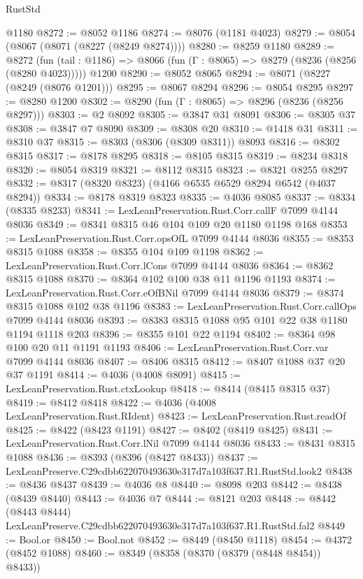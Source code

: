 \begin{lexlean}{RustStd}
\begin{coremodule}
    @1180
@8272 := @8052 @1186
@8274 := @8076 (@1181 @4023)
@8279 := @8054 (@8067 (@8071 (@8227 (@8249 @8274))))
@8280 := @8259 @1180
@8289 := @8272
    (fun (tail : @1186) => @8066 (fun (Γ : @8065) => @8279 (@8236 (@8256 (@8280 @4023)))))
    @1200
@8290 := @8052 @8065
@8294 := @8071 (@8227 (@8249 (@8076 @1201)))
@8295 := @8067 @8294
@8296 := @8054 @8295
@8297 := @8280 @1200
@8302 := @8290 (fun (Γ : @8065) => @8296 (@8236 (@8256 @8297)))
@8303 := @2 @8092
@8305 := @3847 @31 @8091
@8306 := @8305 @37
@8308 := @3847 @7 @8090
@8309 := @8308 @20
@8310 := @1418 @31
@8311 := @8310 @37
@8315 := @8303 (@8306 (@8309 @8311)) @8093
@8316 := @8302 @8315
@8317 := @8178 @8295
@8318 := @8105 @8315
@8319 := @8234 @8318
@8320 := @8054 @8319
@8321 := @8112 @8315
@8323 := @8321 @8255 @8297
@8332 := @8317 (@8320 @8323) (@4166 @6535 @6529 @8294 @6542 (@4037 @8294))
@8334 := @8178 @8319 @8323
@8335 := @4036 @8085
@8337 := @8334 (@8335 @8233)
@8341 := LexLeanPreservation.Rust.Corr.callF @7099 @4144 @8036
@8349 := @8341 @8315 @46 @104 @109 @20 @1180 @1198 @168
@8353 := LexLeanPreservation.Rust.Corr.opsOfL @7099 @4144 @8036
@8355 := @8353 @8315 @1088
@8358 := @8355 @104 @109 @1198
@8362 := LexLeanPreservation.Rust.Corr.lCons @7099 @4144 @8036
@8364 := @8362 @8315 @1088
@8370 := @8364 @102 @100 @38 @11 @1196 @1193
@8374 := LexLeanPreservation.Rust.Corr.eOfBNil @7099 @4144 @8036
@8379 := @8374 @8315 @1088 @102 @38 @1196
@8383 := LexLeanPreservation.Rust.Corr.callOps @7099 @4144 @8036
@8393 := @8383 @8315 @1088 @95 @101 @22 @38 @1180 @1194 @1118 @203
@8396 := @8355 @101 @22 @1194
@8402 := @8364 @98 @100 @20 @11 @1191 @1193
@8406 := LexLeanPreservation.Rust.Corr.var @7099 @4144 @8036
@8407 := @8406 @8315
@8412 := @8407 @1088 @37 @20 @37 @1191
@8414 := @4036 (@4008 @8091)
@8415 := LexLeanPreservation.Rust.ctxLookup
@8418 := @8414 (@8415 @8315 @37)
@8419 := @8412 @8418
@8422 := @4036 (@4008 LexLeanPreservation.Rust.RIdent)
@8423 := LexLeanPreservation.Rust.readOf
@8425 := @8422 (@8423 @1191)
@8427 := @8402 (@8419 @8425)
@8431 := LexLeanPreservation.Rust.Corr.lNil @7099 @4144 @8036
@8433 := @8431 @8315 @1088
@8436 := @8393 (@8396 (@8427 @8433))
@8437 := LexLeanPreserve.C29cdbb622070493630e317d7a103f637.R1.RustStd.look2
@8438 := @8436 @8437
@8439 := @4036 @8
@8440 := @8098 @203
@8442 := @8438 (@8439 @8440)
@8443 := @4036 @7
@8444 := @8121 @203
@8448 := @8442 (@8443 @8444) LexLeanPreserve.C29cdbb622070493630e317d7a103f637.R1.RustStd.fal2
@8449 := Bool.or
@8450 := Bool.not
@8452 := @8449 (@8450 @1118)
@8454 := @4372 (@8452 @1088)
@8460 := @8349 (@8358 (@8370 (@8379 (@8448 @8454)) @8433))

\end{coremodule}
\end{lexlean}
